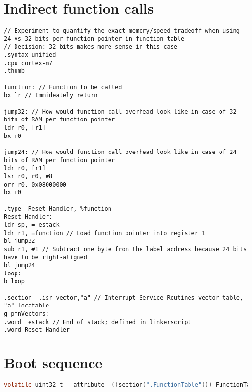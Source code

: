 \newpage

\begin{appendices}
\printglossaries

\newpage
\section{Indirect function calls}
\label{apx:calls}
\begin{lstlisting}[style=asm]
// Experiment to quantify the exact memory/speed tradeoff when using 24 vs 32 bits per function pointer in function table
// Decision: 32 bits makes more sense in this case
.syntax unified
.cpu cortex-m7
.thumb

function: // Function to be called
bx lr // Immideately return

jump32: // How would function call overhead look like in case of 32 bits of RAM per function pointer
ldr r0, [r1]
bx r0

jump24: // How would function call overhead look like in case of 24 bits of RAM per function pointer
ldr r0, [r1]
lsr r0, r0, #8
orr r0, 0x08000000
bx r0

.type  Reset_Handler, %function
Reset_Handler:
ldr sp, =_estack
ldr r1, =function // Load function pointer into register 1
bl jump32
sub r1, #1 // Subtract one byte from the label address because 24 bits have to be right-aligned
bl jump24
loop:
b loop

.section  .isr_vector,"a" // Interrupt Service Routines vector table, "a"llocatable
g_pfnVectors:
.word _estack // End of stack; defined in linkerscript
.word Reset_Handler
\end{lstlisting}


\newpage
\section{Boot sequence}
\label{apx:gentable}
\begin{lstlisting}[language=C]
volatile uint32_t __attribute__((section(".FunctionTable"))) FunctionTable[255];


\end{lstlisting}
\end{appendices}
